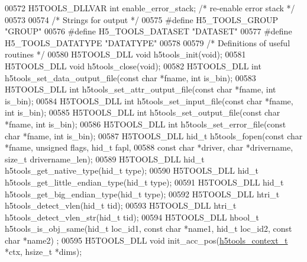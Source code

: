 \begin{DoxyCode}
{{{{{{{{{{{{{{{{{{{00572 H5TOOLS\_DLLVAR \textcolor{keywordtype}{int}     enable\_error\_stack; \textcolor{comment}{/* re-enable error stack */}
00573 
00574 \textcolor{comment}{/* Strings for output */}
00575 \textcolor{preprocessor}{#define H5\_TOOLS\_GROUP           "GROUP"}
00576 \textcolor{preprocessor}{#define H5\_TOOLS\_DATASET         "DATASET"}
00577 \textcolor{preprocessor}{#define H5\_TOOLS\_DATATYPE        "DATATYPE"}
00578 
00579 \textcolor{comment}{/* Definitions of useful routines */}
00580 H5TOOLS\_DLL \textcolor{keywordtype}{void}    h5tools\_init(\textcolor{keywordtype}{void});
00581 H5TOOLS\_DLL \textcolor{keywordtype}{void}    h5tools\_close(\textcolor{keywordtype}{void});
00582 H5TOOLS\_DLL \textcolor{keywordtype}{int}     h5tools\_set\_data\_output\_file(\textcolor{keyword}{const} \textcolor{keywordtype}{char} *fname, \textcolor{keywordtype}{int} is\_bin);
00583 H5TOOLS\_DLL \textcolor{keywordtype}{int}     h5tools\_set\_attr\_output\_file(\textcolor{keyword}{const} \textcolor{keywordtype}{char} *fname, \textcolor{keywordtype}{int} is\_bin);
00584 H5TOOLS\_DLL \textcolor{keywordtype}{int}     h5tools\_set\_input\_file(\textcolor{keyword}{const} \textcolor{keywordtype}{char} *fname, \textcolor{keywordtype}{int} is\_bin);
00585 H5TOOLS\_DLL \textcolor{keywordtype}{int}     h5tools\_set\_output\_file(\textcolor{keyword}{const} \textcolor{keywordtype}{char} *fname, \textcolor{keywordtype}{int} is\_bin);
00586 H5TOOLS\_DLL \textcolor{keywordtype}{int}     h5tools\_set\_error\_file(\textcolor{keyword}{const} \textcolor{keywordtype}{char} *fname, \textcolor{keywordtype}{int} is\_bin);
00587 H5TOOLS\_DLL hid\_t   h5tools\_fopen(\textcolor{keyword}{const} \textcolor{keywordtype}{char} *fname, \textcolor{keywordtype}{unsigned} flags, hid\_t fapl,
00588                             \textcolor{keyword}{const} \textcolor{keywordtype}{char} *driver, \textcolor{keywordtype}{char} *drivername, \textcolor{keywordtype}{size\_t} drivername\_len);
00589 H5TOOLS\_DLL hid\_t   h5tools\_get\_native\_type(hid\_t type);
00590 H5TOOLS\_DLL hid\_t   h5tools\_get\_little\_endian\_type(hid\_t type);
00591 H5TOOLS\_DLL hid\_t   h5tools\_get\_big\_endian\_type(hid\_t type);
00592 H5TOOLS\_DLL htri\_t  h5tools\_detect\_vlen(hid\_t tid);
00593 H5TOOLS\_DLL htri\_t  h5tools\_detect\_vlen\_str(hid\_t tid);
00594 H5TOOLS\_DLL hbool\_t h5tools\_is\_obj\_same(hid\_t loc\_id1, \textcolor{keyword}{const} \textcolor{keywordtype}{char} *name1, hid\_t loc\_id2, \textcolor{keyword}{const} \textcolor{keywordtype}{char} *name2)
      ;
00595 H5TOOLS\_DLL \textcolor{keywordtype}{void}    init\_acc\_pos(\hyperlink{structh5tools__context__t}{h5tools\_context\_t} *ctx, hsize\_t *dims);
}}}}}}}}}}}}}}}}}}}
\end{DoxyCode}
